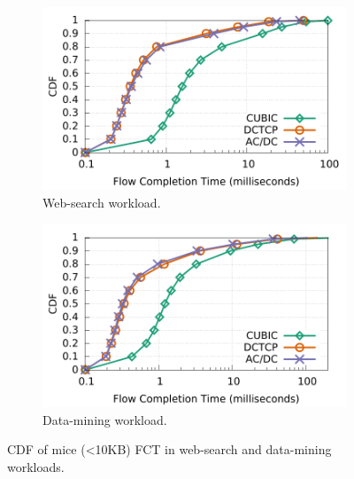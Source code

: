 \begin{figure}[!t]
        \centering
        \begin{subfigure}[b]{0.45\textwidth}
                \centering
                \includegraphics[width=\textwidth]{acdctcp/figures/macro_benchmarks/trace-driven/trace_driven_workload_dctcp_senders5_10points.pdf}
                \caption{Web-search workload.}
                \label{trace-driven-searching-fct}
        \end{subfigure}
        \begin{subfigure}[b]{0.45\textwidth}
                \centering
                \includegraphics[width=\textwidth]{acdctcp/figures/macro_benchmarks/trace-driven/trace_driven_workload_conga_senders5_10points.pdf}
                \caption{Data-mining workload.}
                \label{trace-driven-data-mining-fct}
        \end{subfigure}
        \caption{CDF of mice (<10KB) FCT in web-search and data-mining workloads.}
        \label{macro-trace-driven-fct}
\end{figure}
\fi


